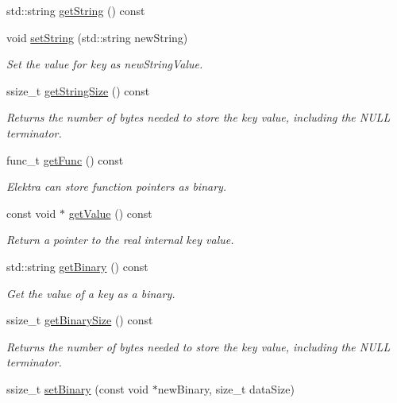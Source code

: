 \begin{DoxyCompactItemize}
std\+::string \hyperlink{classkdb_1_1Key_afbad98e920ffb6d65d5d690be73ae6d9}{get\+String} () const 
\item 
void \hyperlink{classkdb_1_1Key_ab97ef37aa235f0ae04dc6e6c21109d1a}{set\+String} (std\+::string new\+String)
\begin{DoxyCompactList}\small\item\em Set the value for {\ttfamily key} as {\ttfamily new\+String\+Value}. \end{DoxyCompactList}\item 
ssize\+\_\+t \hyperlink{classkdb_1_1Key_af3032a91f0fbf111b6b5e42dd35865db}{get\+String\+Size} () const 
\begin{DoxyCompactList}\small\item\em Returns the number of bytes needed to store the key value, including the N\+U\+L\+L terminator. \end{DoxyCompactList}\item 
func\+\_\+t \hyperlink{classkdb_1_1Key_a9e4f81dae7370976dad75030e8c0d084}{get\+Func} () const 
\begin{DoxyCompactList}\small\item\em Elektra can store function pointers as binary. \end{DoxyCompactList}\item 
const void $\ast$ \hyperlink{classkdb_1_1Key_a3e0bbc6b746b89db7abb73a4cc2fff39}{get\+Value} () const 
\begin{DoxyCompactList}\small\item\em Return a pointer to the real internal {\ttfamily key} value. \end{DoxyCompactList}\item 
std\+::string \hyperlink{classkdb_1_1Key_a16b64fd6db0a743e2e4ab08daf6fba73}{get\+Binary} () const 
\begin{DoxyCompactList}\small\item\em Get the value of a key as a binary. \end{DoxyCompactList}\item 
ssize\+\_\+t \hyperlink{classkdb_1_1Key_af173c1c4ab4104c5bc48a98cf011ca8d}{get\+Binary\+Size} () const 
\begin{DoxyCompactList}\small\item\em Returns the number of bytes needed to store the key value, including the N\+U\+L\+L terminator. \end{DoxyCompactList}\item 
ssize\+\_\+t \hyperlink{classkdb_1_1Key_af7211129a4b95f4d1e335dcd06e9bf0a}{set\+Binary} (const void $\ast$new\+Binary, size\+\_\+t data\+Size)

\end{DoxyCompactItemize}
